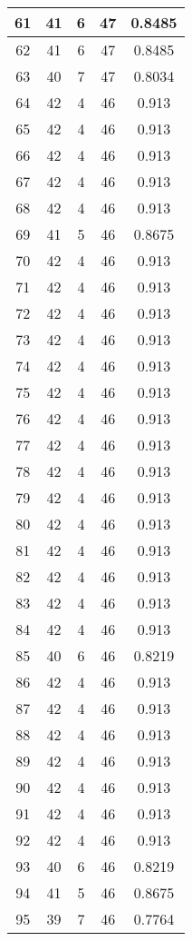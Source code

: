 \documentclass[letterpaper, 12pt]{article}
\begin{document}
\begin{longtable}{|c|c|c|c|c|}
\hline
61 & 41 & 6 & 47 & 0.8485 \\
\hline
62 & 41 & 6 & 47 & 0.8485 \\
\hline
63 & 40 & 7 & 47 & 0.8034 \\
\hline
64 & 42 & 4 & 46 & 0.913 \\
\hline
65 & 42 & 4 & 46 & 0.913 \\
\hline
66 & 42 & 4 & 46 & 0.913 \\
\hline
67 & 42 & 4 & 46 & 0.913 \\
\hline
68 & 42 & 4 & 46 & 0.913 \\
\hline
69 & 41 & 5 & 46 & 0.8675 \\
\hline
70 & 42 & 4 & 46 & 0.913 \\
\hline
71 & 42 & 4 & 46 & 0.913 \\
\hline
72 & 42 & 4 & 46 & 0.913 \\
\hline
73 & 42 & 4 & 46 & 0.913 \\
\hline
74 & 42 & 4 & 46 & 0.913 \\
\hline
75 & 42 & 4 & 46 & 0.913 \\
\hline
76 & 42 & 4 & 46 & 0.913 \\
\hline
77 & 42 & 4 & 46 & 0.913 \\
\hline
78 & 42 & 4 & 46 & 0.913 \\
\hline
79 & 42 & 4 & 46 & 0.913 \\
\hline
80 & 42 & 4 & 46 & 0.913 \\
\hline
81 & 42 & 4 & 46 & 0.913 \\
\hline
82 & 42 & 4 & 46 & 0.913 \\
\hline
83 & 42 & 4 & 46 & 0.913 \\
\hline
84 & 42 & 4 & 46 & 0.913 \\
\hline
85 & 40 & 6 & 46 & 0.8219 \\
\hline
86 & 42 & 4 & 46 & 0.913 \\
\hline
87 & 42 & 4 & 46 & 0.913 \\
\hline
88 & 42 & 4 & 46 & 0.913 \\
\hline
89 & 42 & 4 & 46 & 0.913 \\
\hline
90 & 42 & 4 & 46 & 0.913 \\
\hline
91 & 42 & 4 & 46 & 0.913 \\
\hline
92 & 42 & 4 & 46 & 0.913 \\
\hline
93 & 40 & 6 & 46 & 0.8219 \\
\hline
94 & 41 & 5 & 46 & 0.8675 \\
\hline
95 & 39 & 7 & 46 & 0.7764 \\

\end{longtable}
\end{document}
